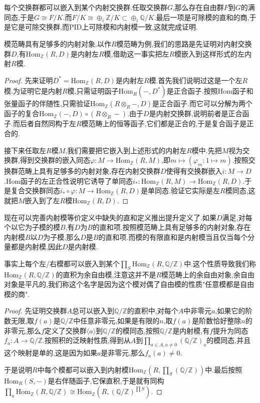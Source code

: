 每个交换群都可以嵌入到某个内射交换群.任取交换群$G$,那么存在自由群$F$到$G$的满同态,于是$G\cong F/K$.而$F/K\cong\oplus_i\mathbb{Z}/K\subset\oplus_i\mathbb{Q}/K$.最后一项是可除模的直和的商,于是它是可除交换群,而PID上可除模和内射模一致,这就完成证明.

模范畴具有足够多的内射对象.以作$R$模范畴为例,我们的思路是先证明对内射交换群$D$,有$\mathrm{Hom}_{\mathbb{Z}}(R,D)$是内射左$R$模,借助这一事实把左$R$模嵌入到这样形式的左内射$R$模.
\begin{proof}
	
	先来证明$D^*=\mathrm{Hom}_{\mathbb{Z}}(R,D)$是内射左$R$模.首先我们说明过这是一个左$R$模.为证明它是内射$R$模,只需证明函子$\mathrm{Hom}_R(-,D^*)$是正合函子.按照Hom函子和张量函子的伴随性,只需验证$\mathrm{Hom}_{\mathbb{Z}}(R\otimes_R-,D)$是正合函子.而它可以分解为两个函子的复合$\mathrm{Hom}_{\mathbb{Z}}(-,D)\circ(R\otimes_R-)$.由于$D$是内射交换群,说明前者是正合函子.而后者自然同构于左$R$模范畴上的恒等函子,它们都是正合的,于是复合函子是正合的.
	
	接下来任取左$R$模$M$,我们需要把它嵌入到上述形式的内射左$R$模中.先把$M$视为交换群,得到交换群的嵌入同态$\varphi:M\to\mathrm{Hom}_{\mathbb{Z}}(R,M)$,即$m\mapsto(\varphi_m:1\mapsto m)$.按照交换群范畴上具有足够多的内射对象,存在内射交换群$D$使得有交换群嵌入$i:M\to D$.Hom函子的左正合性说明它诱导了单同态$i_*:\mathrm{Hom}_{\mathbb{Z}}(R,M)\to\mathrm{Hom}_{\mathbb{Z}}(R,D)$.于是复合交换群同态$i_*\circ\varphi:M\to\mathrm{Hom}_{\mathbb{Z}}(R,D)$是单同态.验证它实际是左$R$模同态,这就把$M$嵌入到了左$R$模$\mathrm{Hom}_{\mathbb{Z}}(R,D)$.
\end{proof}

现在可以完善内射模等价定义中缺失的直和定义推出提升定义了.如果$D$满足,对每个以它为子模的模$B$,有$D$为$B$的直和项.按照模范畴上具有足够多的内射对象,存在内射模$B$以$D$为子模,那么$D$是$B$的直和项.而模的有限直和是内射模当且仅当每个分量都是内射模,因此$D$是内射模.

事实上每个左/右模都可以嵌入到某个$\prod_{S}\mathrm{Hom}_ {\mathbb{Z}}(R,\mathbb{Q}/\mathbb{Z})$中.这个性质导致我们称$\mathrm{Hom}_{\mathbb{Z}}(R,\mathbb{Q}/\mathbb{Z})$的直积为余自由模,注意这并不是$R$模范畴上的余自由对象,余自由对象是平凡的,我们称这个名字是因为这个模对偶了自由模的性质"任意模都是自由模的商".
\begin{proof}
	
	先证明交换群$A$总可以嵌入到$\mathbb{Q}/\mathbb{Z}$的直积中,对每个$A$中非零元$a$,如果它的阶数无限,取$f(a)$是$\mathbb{Q}/\mathbb{Z}$中任意非零元,如果是有限的$n$,取$f(a)$是阶数恰好整除$n$的非零元,那么$f$定义了交换群$\langle a\rangle$到$\mathbb{Q}/\mathbb{Z}$的模同态,按照$\mathbb{Q}/\mathbb{Z}$是内射模,有$f$提升为同态$f_a:A\to \mathbb{Q}/\mathbb{Z}$.按照积的泛映射性质,得到从$A$到$\prod_{a\in A,a\not=0}(\mathbb{Q}/\mathbb{Z})_a$的模同态,并且这个映射是单的,这是因为如果$a$是非零元,那么$f_a(a)\not=0$.
	
	于是说明$R$中每个模都可以嵌入到内射模$\mathrm{Hom}_ {\mathbb{Z}}(R,\prod_{S}(\mathbb{Q}/\mathbb{Z}))$中.最后按照$\mathrm{Hom}_R(S,-)$是右伴随函子,它保直积,于是就有同构$\prod_a\mathrm{Hom}_{\mathbb{Z}}(R,\mathbb{Q}/\mathbb{Z})\cong \mathrm{Hom}_{\mathbb{Z}}(R,(\mathbb{Q}/\mathbb{Z})^{\prod S})$.
\end{proof}

